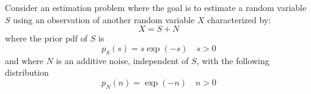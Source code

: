 \begin{solution}
 \end{solution}

\else

\question 
Consider an estimation problem where the goal is to estimate a random variable $S$ using an observation of another random variable $X$ characterized by:
$$X=S+N$$
where the prior pdf of $S$ is
$$p_S(s)=s\exp(-s) \quad s>0$$
and where $N$ is an additive noise, independent of $S$, with the following distribution
$$p_N(n)=\exp(-n) \quad n>0$$

